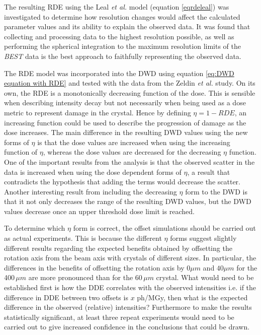 The resulting RDE using the Leal \textit{et al.}  model (equation \ref{eqrdeleal}) was investigated to determine how resolution changes would affect the calculated parameter values and its ability to explain the observed data.
It was found that collecting and processing data to the highest resolution possible, as well as performing the spherical integration to the maximum resolution limits of the \textit{BEST} data is the best approach to faithfully representing the observed data.

The RDE model was incorporated into the DWD using equation \ref{eq:DWD equation with RDE} and tested with the data from the Zeldin \textit{et al.} study.
On its own, the RDE is a monotonically decreasing function of the dose.
This is sensible when describing intensity decay but not necessarily when being used as a dose metric to represent damage in the crystal.
Hence by defining $\eta = 1 - RDE$, an increasing function could be used to describe the progression of damage as the dose increases.
The main difference in the resulting DWD values using the new forms of $\eta$ is that the dose values are increased when using the increasing function of $\eta$, whereas the dose values are decreased for the decreasing $\eta$ function.
One of the important results from the analysis is that the observed scatter in the data is increased when using the dose dependent forms of $\eta$, a result that contradicts the hypothesis that adding the terms would decrease the scatter.
Another interesting result from including the decreasing $\eta$ form to the DWD is that it not only decreases the range of the resulting DWD values, but the DWD values decrease once an upper threshold dose limit is reached.

To determine which $\eta$ form is correct, the offset simulations should be carried out as actual experiments.
This is because the different $\eta$ forms suggest slightly different results regarding the expected benefits obtained by offsetting the rotation axis from the beam axis with crystals of different sizes.
In particular, the differences in the benefits of offsetting the rotation axis by 0$\mu m$ and $40\mu m$ for the 400$\,\mu m$ are more pronounced than for the 60$\,\mu m$ crystal.
What would need to be established first is how the DDE correlates with the observed intensities i.e. if the difference in DDE between two offsets is $x$ ph/MGy, then what is the expected difference in the observed (relative) intensities?
Furthermore to make the results statistically significant, at least three repeat experiments would need to be carried out to give increased confidence in the conclusions that could be drawn.

